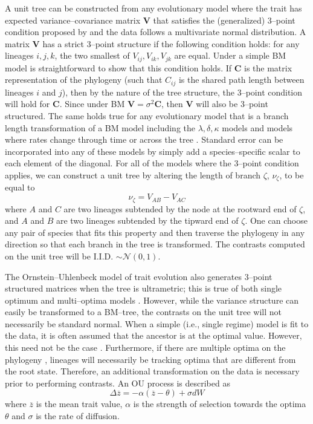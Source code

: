 \documentclass[a4paper,11pt]{article}
\begin{document}
A unit tree can be constructed from any evolutionary model where the trait has expected variance--covariance matrix $\mathbf{V}$ that satisfies the (generalized) 3--point condition proposed by \citet{Ho2014} and the data follows a multivariate normal distribution. A matrix $\mathbf{V}$ has a strict 3--point structure if the following condition holds: for any lineages $i,j,k$, the two smallest of $V_{ij}, V_{ik}, V_{jk}$ are equal. Under a simple BM model is straightforward to show that this condition holds. If $\mathbf{C}$ is the matrix representation of the phylogeny (such that $C_{ij}$ is the shared path length between lineages $i$ and $j$), then by the nature of the tree structure, the 3--point condition will hold for $\mathbf{C}$. Since under BM $\mathbf{V}=\sigma^2\mathbf{C}$, then $\mathbf{V}$ will also be 3--point structured. The same holds true for any evolutionary model that is a branch length transformation of a BM model including the $\lambda, \delta, \kappa$ models \citep{Pagel1997,Pagel1999} and models where rates change through time \citep[the ACDC or EB model;][]{Blomberg2003, Harmon2010} or across the tree \citep{Omeara2006, Thomas2006, Eastman2011, Revell2011, motmot}. Standard error can be incorporated into any of these models by simply add a species--specific scalar to each element of the diagonal. For all of the models where the 3--point condition applies, we can construct a unit tree by altering the length of branch $\zeta$, $\nu_{\zeta}$, to be equal to
\begin{equation}\label{eq:ut}
\nu_{\zeta} = V_{AB} - V_{AC}
\end{equation}
where $A$ and $C$ are two lineages subtended by the node at the rootward end of $\zeta$, and $A$ and $B$ are two lineages subtended by the tipward end of $\zeta$.  One can choose any pair of species that fits this property and then traverse the phylogeny in any direction so that each branch in the tree is transformed. The contrasts computed on the unit tree will be I.I.D. $\sim \mathcal{N}(0,1)$.

The Ornstein--Uhlenbeck model of trait evolution \citep{Hansen1997, ButlerKing2004} also generates 3--point structured matrices when the tree is ultrametric; this is true of both single optimum and multi--optima models \citep{Ho2014}. However, while the variance structure can easily be transformed to a BM--tree, the contrasts on the unit tree will not necessarily be standard normal. When a simple (i.e., single regime) model is fit to the data, it is often assumed that the ancestor is at the optimal value. However, this need not be the case \citep{HoAne2013}. Furthermore, if there are multiple optima on the phylogeny \citep{ButlerKing2004, IngramMahler2013, Uyedabayou}, lineages will necessarily be tracking optima that are different from the root state. Therefore, an additional transformation on the data is necessary prior to performing contrasts. An OU process is described as 
\[\Delta \overline{z} = -\alpha (\overline{z} - \theta) + \sigma dW\]
where $\overline{z}$ is the mean trait value, $\alpha$ is the strength of selection towards the optima $\theta$ and $\sigma$ is the rate of diffusion.
\end{document}
